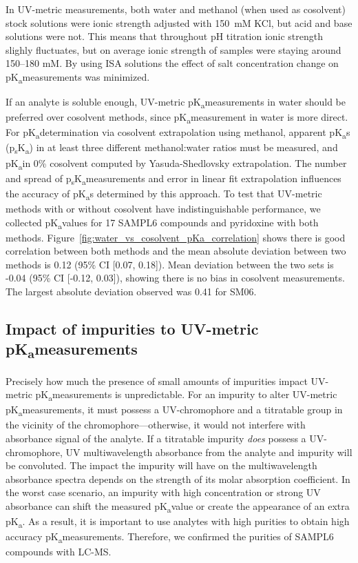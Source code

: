 \documentclass[9pt,lineno]{elife}
\newcommand{\pKa}{pK\textsubscript{a}}
\newcommand{\psKa}{p\textsubscript{s}K\textsubscript{a}}
\begin{document}
In UV-metric measurements, both water and methanol (when used as cosolvent) stock solutions were ionic strength adjusted with 150~mM KCl, but acid and base solutions were not. This means that throughout pH titration ionic strength slighly fluctuates, but on average ionic strength of samples were staying around 150--180 mM. By using ISA solutions the effect of salt concentration change on \pKa measurements was minimized.

If an analyte is soluble enough, UV-metric \pKa measurements in water should be preferred over cosolvent methods, since \pKa measurement in water is more direct. 
For \pKa determination via cosolvent extrapolation using methanol, apparent \pKa s (\psKa) in at least three different methanol:water ratios must be measured, and \pKa in 0\% cosolvent computed by Yasuda-Shedlovsky extrapolation. 
The number and spread of \psKa measurements and error in linear fit extrapolation influences the accuracy of \pKa s determined by this approach. 
To test that UV-metric methods with or without cosolvent have indistinguishable performance, we collected \pKa values for 17 SAMPL6 compounds and pyridoxine with both methods. 
Figure~\ref{fig:water_vs_cosolvent_pKa_correlation} shows there is good correlation between both methods and the mean absolute deviation between two methods is 0.12 (95\% CI [0.07, 0.18]). Mean deviation between the two sets is -0.04 (95\% CI [-0.12, 0.03]), showing there is no bias in cosolvent measurements. The largest absolute deviation observed was 0.41 for SM06. 


\subsection{Impact of impurities to UV-metric \pKa measurements}

Precisely how much the presence of small amounts of impurities impact UV-metric \pKa measurements is unpredictable. 
For an impurity to alter UV-metric \pKa measurements, it must possess a UV-chromophore and a titratable group in the vicinity of the chromophore---otherwise, it would not interfere with absorbance signal of the analyte. 
If a titratable impurity \emph{does} possess a UV-chromophore, UV multiwavelength absorbance from the analyte and impurity will be convoluted. 
The impact the impurity will have on the multiwavelength absorbance spectra depends on the strength of its molar absorption coefficient. 
In the worst case scenario, an impurity with high concentration or strong UV absorbance can shift the measured \pKa value or create the appearance of an extra \pKa. As a result, it is important to use analytes with high purities to obtain high accuracy \pKa measurements. 
Therefore, we confirmed the purities of SAMPL6 compounds with LC-MS.   
\end{document}
